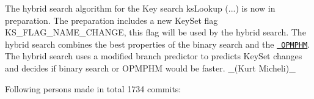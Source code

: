 \begin{DoxyItemize}
\item The hybrid search algorithm for the Key search {\ttfamily ks\+Lookup (...)} is now in preparation. The preparation includes a new Key\+Set flag {\ttfamily K\+S\+\_\+\+F\+L\+A\+G\+\_\+\+N\+A\+M\+E\+\_\+\+C\+H\+A\+N\+GE}, this flag will be used by the hybrid search. The hybrid search combines the best properties of the binary search and the \href{https://master.libelektra.org/doc/dev/data-structures.md\#order-preserving-minimal-perfect-hash-map-aka-opmphm}{\texttt{ O\+P\+M\+P\+HM}}. The hybrid search uses a modified branch predictor to predicts Key\+Set changes and decides if binary search or O\+P\+M\+P\+HM would be faster. \+\_\+(\+Kurt Micheli)\+\_\+
\end{DoxyItemize}

Following persons made in total 1734 commits\+:

